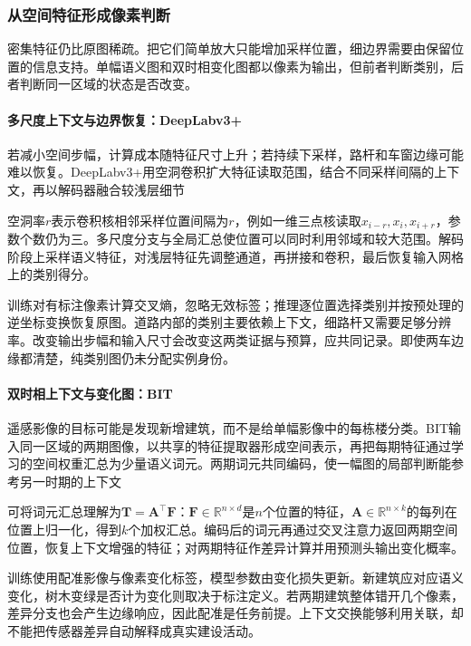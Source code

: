 \subsubsection{从空间特征形成像素判断}
\label{sec:vision-recognition-dense-pixels}

密集特征仍比原图稀疏。把它们简单放大只能增加采样位置，细边界需要由保留位置的信息支持。单幅语义图和双时相变化图都以像素为输出，但前者判断类别，后者判断同一区域的状态是否改变。

\Needspace{60mm}
\paragraph{多尺度上下文与边界恢复：DeepLabv3+}
\label{sec:vision-recognition-deeplab}

若减小空间步幅，计算成本随特征尺寸上升；若持续下采样，路杆和车窗边缘可能难以恢复。DeepLabv3+用空洞卷积扩大特征读取范围，结合不同采样间隔的上下文，再以解码器融合较浅层细节

空洞率$r$表示卷积核相邻采样位置间隔为$r$，例如一维三点核读取$x_{i-r},x_i,x_{i+r}$，参数个数仍为三。多尺度分支与全局汇总使位置可以同时利用邻域和较大范围。解码阶段上采样语义特征，对浅层特征先调整通道，再拼接和卷积，最后恢复输入网格上的类别得分。

训练对有标注像素计算交叉熵，忽略无效标签；推理逐位置选择类别并按预处理的逆坐标变换恢复原图。道路内部的类别主要依赖上下文，细路杆又需要足够分辨率。改变输出步幅和输入尺寸会改变这两类证据与预算，应共同记录。即使两车边缘都清楚，纯类别图仍未分配实例身份。

\paragraph{双时相上下文与变化图：BIT}
\label{sec:vision-recognition-bit}

遥感影像的目标可能是发现新增建筑，而不是给单幅影像中的每栋楼分类。BIT输入同一区域的两期图像，以共享的特征提取器形成空间表示，再把每期特征通过学习的空间权重汇总为少量语义词元。两期词元共同编码，使一幅图的局部判断能参考另一时期的上下文

可将词元汇总理解为$\bm{T}=\bm{A}^{\top}\bm{F}$：$\bm{F}\in\mathbb{R}^{n\times d}$是$n$个位置的特征，$\bm{A}\in\mathbb{R}^{n\times k}$的每列在位置上归一化，得到$k$个加权汇总。编码后的词元再通过交叉注意力返回两期空间位置，恢复上下文增强的特征；对两期特征作差异计算并用预测头输出变化概率。

训练使用配准影像与像素变化标签，模型参数由变化损失更新。新建筑应对应语义变化，树木变绿是否计为变化则取决于标注定义。若两期建筑整体错开几个像素，差异分支也会产生边缘响应，因此配准是任务前提。上下文交换能够利用关联，却不能把传感器差异自动解释成真实建设活动。

